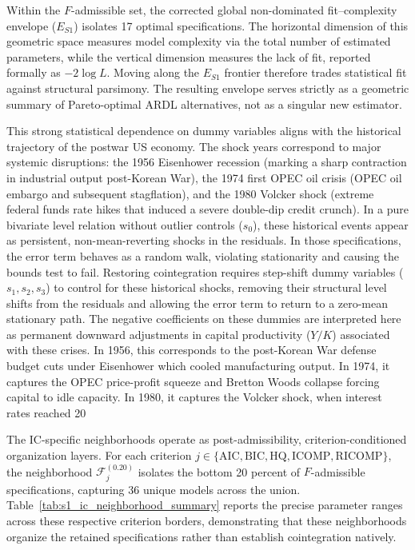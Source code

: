 \documentclass[11pt]{article}
\begin{document}
Within the \(F\)-admissible set, the corrected global non-dominated fit--complexity envelope (\(E_{S1}\)) isolates 17 optimal specifications. The horizontal dimension of this geometric space measures model complexity via the total number of estimated parameters, while the vertical dimension measures the lack of fit, reported formally as \(-2\log L\). Moving along the \(E_{S1}\) frontier therefore trades statistical fit against structural parsimony. The resulting envelope serves strictly as a geometric summary of Pareto-optimal ARDL alternatives, not as a singular new estimator.

This strong statistical dependence on dummy variables aligns with the historical trajectory of the postwar US economy. The shock years correspond to major systemic disruptions: the 1956 Eisenhower recession (marking a sharp contraction in industrial output post-Korean War), the 1974 first OPEC oil crisis (OPEC oil embargo and subsequent stagflation), and the 1980 Volcker shock (extreme federal funds rate hikes that induced a severe double-dip credit crunch). In a pure bivariate level relation without outlier controls ($s_0$), these historical events appear as persistent, non-mean-reverting shocks in the residuals. In those specifications, the error term behaves as a random walk, violating stationarity and causing the bounds test to fail. Restoring cointegration requires step-shift dummy variables ($s_1, s_2, s_3$) to control for these historical shocks, removing their structural level shifts from the residuals and allowing the error term to return to a zero-mean stationary path. The negative coefficients on these dummies are interpreted here as permanent downward adjustments in capital productivity ($Y/K$) associated with these crises. In 1956, this corresponds to the post-Korean War defense budget cuts under Eisenhower which cooled manufacturing output. In 1974, it captures the OPEC price-profit squeeze and Bretton Woods collapse forcing capital to idle capacity. In 1980, it captures the Volcker shock, when interest rates reached 20%

The IC-specific neighborhoods operate as post-admissibility, criterion-conditioned organization layers. For each criterion \(j \in \{\mathrm{AIC},\mathrm{BIC},\mathrm{HQ},\mathrm{ICOMP},\mathrm{RICOMP}\}\), the neighborhood \(\mathcal{F}^{(0.20)}_j\) isolates the bottom 20 percent of \(F\)-admissible specifications, capturing 36 unique models across the union. Table~\ref{tab:s1_ic_neighborhood_summary} reports the precise parameter ranges across these respective criterion borders, demonstrating that these neighborhoods organize the retained specifications rather than establish cointegration natively. 
\end{document}
